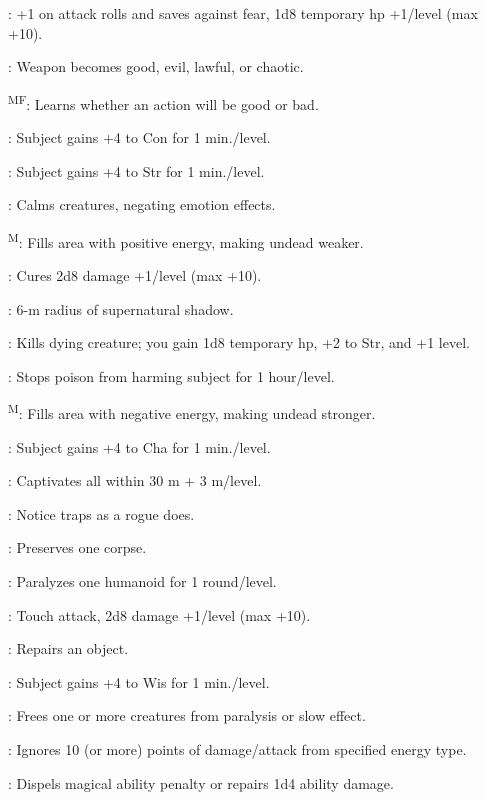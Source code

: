 : +1 on attack rolls and saves against fear, 1d8 temporary hp +1/level (max +10).

: Weapon becomes good, evil, lawful, or chaotic.

\textsuperscript{MF}: Learns whether an action will be good or bad.

: Subject gains +4 to Con for 1 min./level.

: Subject gains +4 to Str for 1 min./level.

: Calms creatures, negating emotion effects.

\textsuperscript{M}: Fills area with positive energy, making undead weaker.

: Cures 2d8 damage +1/level (max +10).

: 6-m radius of supernatural shadow.

: Kills dying creature; you gain 1d8 temporary hp, +2 to Str, and +1 level.

: Stops poison from harming subject for 1 hour/level.

\textsuperscript{M}: Fills area with negative energy, making undead stronger.

: Subject gains +4 to Cha for 1 min./level.

: Captivates all within 30 m + 3 m/level.

: Notice traps as a rogue does.

: Preserves one corpse.

: Paralyzes one humanoid for 1 round/level.

: Touch attack, 2d8 damage +1/level (max +10).

: Repairs an object.

: Subject gains +4 to Wis for 1 min./level.

: Frees one or more creatures from paralysis or slow effect.

: Ignores 10 (or more) points of damage/attack from specified energy type.

: Dispels magical ability penalty or repairs 1d4 ability damage.


